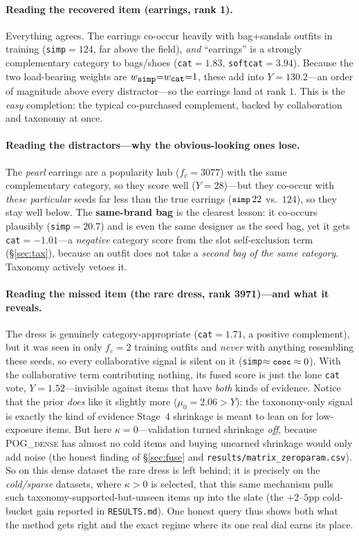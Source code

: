 \documentclass[11pt]{article}
\theoremstyle{remark}
\newcommand{\code}[1]{\texttt{\small #1}}
\begin{document}
\paragraph{Reading the recovered item (earrings, rank 1).} Everything agrees. The earrings co-occur heavily with
bag$+$sandals outfits in training (\code{simp}$=124$, far above the field), \emph{and} ``earrings'' is a
strongly complementary category to bags/shoes (\code{cat}$=1.83$, \code{softcat}$=3.94$). Because the two
load-bearing weights are $w_{\code{simp}}{=}w_{\code{cat}}{=}1$, these add into $Y=130.2$---an order of magnitude
above every distractor---so the earrings land at rank $1$. This is the \emph{easy} completion: the typical
co-purchased complement, backed by collaboration and taxonomy at once.

\paragraph{Reading the distractors---why the obvious-looking ones lose.} The \emph{pearl} earrings are a popularity
hub ($f_c{=}3077$) with the same complementary category, so they score well ($Y{=}28$)---but they co-occur with
\emph{these particular} seeds far less than the true earrings ($\code{simp}\,22$ vs.\ $124$), so they stay well
below. The \textbf{same-brand bag} is the clearest lesson: it co-occurs plausibly (\code{simp}$=20.7$) and is even
the same designer as the seed bag, yet it gets \code{cat}$=-1.01$---a \emph{negative} category score from the
slot self-exclusion term (\S\ref{sec:tax}), because an outfit does not take a \emph{second bag of the same
category}. Taxonomy actively vetoes it.

\paragraph{Reading the missed item (the rare dress, rank 3971)---and what it reveals.} The dress is genuinely
category-appropriate (\code{cat}$=1.71$, a positive complement), but it was seen in only $f_c{=}2$ training outfits
and \emph{never} with anything resembling these seeds, so every collaborative signal is silent on it
(\code{simp}$\approx\code{cooc}\approx 0$). With the collaborative term contributing nothing, its fused score is just
the lone \code{cat} vote, $Y=1.52$---invisible against items that have \emph{both} kinds of evidence. Notice that the
prior \emph{does} like it slightly more ($\mu_0=2.06>Y$): the taxonomy-only signal is exactly the kind of evidence
Stage~4 shrinkage is meant to lean on for low-exposure items. But here $\kappa{=}0$---validation turned shrinkage
\emph{off}, because \textsc{POG\_dense} has almost no cold items and buying unearned shrinkage would only add noise
(the honest finding of \S\ref{sec:fuse} and \code{results/matrix\_zeroparam.csv}). So on this dense dataset the rare
dress is left behind; it is precisely on the \emph{cold/sparse} datasets, where $\kappa>0$ is selected, that this
same mechanism pulls such taxonomy-supported-but-unseen items up into the slate (the $+2$--$5$pp cold-bucket gain
reported in \code{RESULTS.md}). One honest query thus shows both what the method gets right and the exact regime
where its one real dial earns its place.
\end{document}
